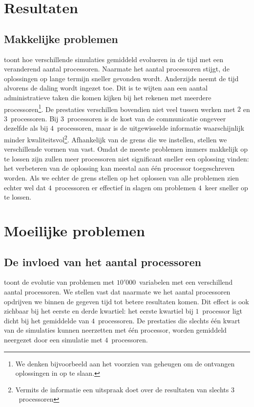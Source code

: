 \section{Resultaten}

\subsection{Makkelijke problemen}


 toont hoe verschillende simulaties gemiddeld evolueren in de tijd met een veranderend aantal processoren. Naarmate het aantal processoren stijgt, de oplossingen op lange termijn sneller gevonden wordt. Anderzijds neemt de tijd alvorens de daling wordt ingezet toe. Dit is te wijten aan een aantal administratieve taken die komen kijken bij het rekenen met meerdere processoren\footnote{We denken bijvoorbeeld aan het voorzien van geheugen om de ontvangen oplossingen in op te slaan.}. De prestaties verschillen bovendien niet veel tussen werken met $2$ en $3$~processoren. Bij $3$~processoren is de kost van de communicatie ongeveer dezelfde als bij $4$~processoren, maar is de uitgewisselde informatie waarschijnlijk minder kwaliteitsvol\footnote{Vermits de informatie een uitspraak doet over de resultaten van slechts $3$~processoren}. Afhankelijk van de grens die we instellen, stellen we verschillende vormen van \absu{} vast. Omdat de meeste problemen immers makkelijk op te lossen zijn zullen meer processoren niet significant sneller een oplossing vinden: het verbeteren van de oplossing kan meestal aan \'e\'en processor toegeschreven worden. Als we echter de grens stellen op het oplossen van alle problemen zien echter wel dat $4$~processoren er effectief in slagen om problemen $4$~keer sneller op te lossen.

\section{Moeilijke problemen}

\subsection{De invloed van het aantal processoren}


 toont de evolutie van problemen met $10'000$~variabelen met een verschillend aantal processoren. We stellen vast dat naarmate we het aantal processoren opdrijven we binnen de gegeven tijd tot betere resultaten komen. Dit effect is ook zichbaar bij het eerste en derde kwartiel: het eerste kwartiel bij $1$~processor ligt dicht bij het gemiddelde van $4$~processoren. De prestaties die slechts \'e\'en kwart van de simulaties kunnen neerzetten met \'e\'en processor, worden gemiddeld neergezet door een simulatie met $4$~processoren.
